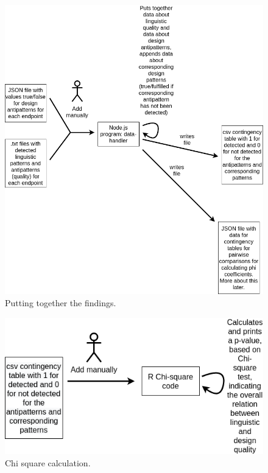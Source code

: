 \begin{figure}[h!]
 \centering
 \includegraphics[scale=0.45]{img/method_figures/data_handler.png}
 \caption{Putting together the findings.}
 \label{fig:Puttingtogetherthefindings}
\end{figure}

\begin{figure}[h!]
 \centering
 \includegraphics[scale=0.5]{img/method_figures/R_Chi_square.png}
 \caption{Chi square calculation.}
 \label{fig:Rchisquarecalculation}
\end{figure}


